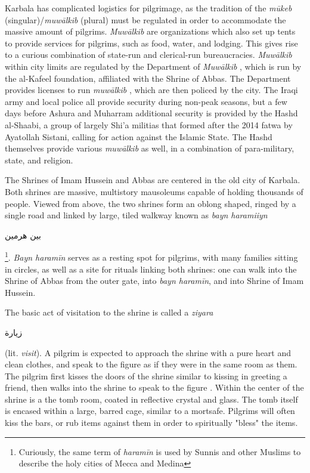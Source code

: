 Karbala has complicated logistics for pilgrimage, as the tradition of the \emph{mūkeb} (singular)/\emph{muwālkib} (plural) must be regulated in order to accommodate the massive amount of pilgrims. \emph{Muwālkib}  are organizations which also set up tents to provide services for pilgrims, such as food, water, and lodging. This gives rise to a curious combination of state-run and clerical-run bureaucracies. \emph{Muwālkib}  within city limits are regulated by the Department of \emph{Muwālkib} , which is run by the al-Kafeel foundation, affiliated with the Shrine of Abbas. The Department provides licenses to run \emph{muwālkib} , which are then policed by the city. The Iraqi army and local police all provide security during non-peak seasons, but a few days before Ashura and Muharram additional security is provided by the Hashd al-Shaabi, a group of largely Shi'a militias that formed after the 2014 fatwa by Ayatollah Sistani, calling for action against the Islamic State. The Hashd themselves provide various \emph{muwālkib}  as well, in a combination of para-military, state, and religion. 

The Shrines of Imam Hussein and Abbas are centered in the old city of Karbala. Both shrines are massive, multistory mausoleums capable of holding thousands of people. Viewed from above, the two shrines form an oblong shaped, ringed by a single road and linked by large, tiled walkway known as \emph{bayn haramiiyn}\begin{Arabic}بين هرمين \end{Arabic}\footnote{Curiously, the same term of \emph{haramīn} is used by Sunnis and other Muslims to describe the holy cities of Mecca and Medina}. \emph{Bayn haramīn} serves as a resting spot for pilgrims, with many families sitting in circles, as well as a site for rituals linking both shrines: one can walk into the Shrine of Abbas from the outer gate, into \emph{bayn haramīn}, and into Shrine of Imam Hussein. 

The basic act of visitation to the shrine is called a \emph{ziyara} \begin{Arabic}
    زيارة
\end{Arabic} (lit. \emph{visit}). A pilgrim is expected to approach the shrine with a pure heart and clean clothes, and speak to the figure as if they were in the same room as them. The pilgrim first kisses the doors of the shrine similar to kissing in greeting a friend, then walks into the shrine to speak to the figure \cite{qisa_publications_illustrated_2018}. Within the center of the shrine is a the tomb room, coated in reflective crystal and glass. The tomb itself is encased within a large, barred cage, similar to a mortsafe. Pilgrims will often kiss the bars, or rub items against them in order to spiritually "bless" the items. 

